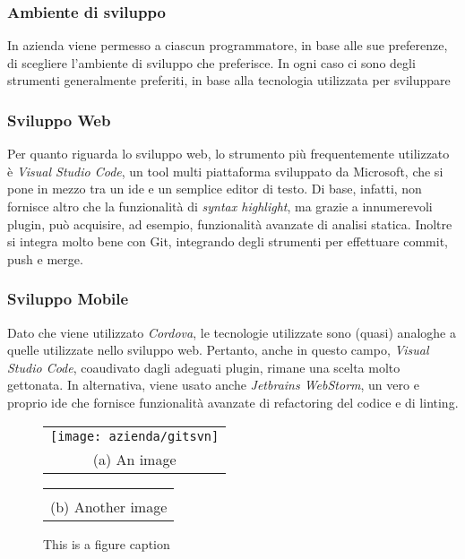 \subsubsection{Ambiente di sviluppo}
In azienda viene permesso a ciascun programmatore, in base alle sue preferenze, di scegliere l'ambiente di sviluppo che preferisce. In ogni caso ci sono degli strumenti generalmente preferiti, in base alla tecnologia utilizzata per sviluppare

\subsubsection{Sviluppo Web}
Per quanto riguarda lo sviluppo web, lo strumento più frequentemente utilizzato è \textit{Visual Studio Code}, un tool multi piattaforma sviluppato da Microsoft, che si pone in mezzo tra un \gls{ide} e un semplice editor di testo. Di base, infatti, non fornisce altro che la funzionalità di \textit{syntax highlight}, ma grazie a innumerevoli plugin, può acquisire, ad esempio, funzionalità avanzate di analisi statica. Inoltre si integra molto bene con Git, integrando degli strumenti per effettuare commit, push e merge.

\subsubsection{Sviluppo Mobile}
Dato che viene utilizzato \textit{Cordova}, le tecnologie utilizzate sono (quasi) analoghe a quelle utilizzate nello sviluppo web. Pertanto, anche in questo campo, \textit{Visual Studio Code}, coaudivato dagli adeguati plugin, rimane una scelta molto gettonata. In alternativa, viene usato anche \textit{Jetbrains WebStorm}, un vero e proprio \gls{ide} che fornisce funzionalità avanzate di refactoring del codice e di linting.

\begin{figure}
	\centering
	\begin{tabular}{@{}c@{}}
		\texttt{[image: azienda/gitsvn]}  \\[\abovecaptionskip]
		\small (a) An image
	\end{tabular}
	
	\vspace{\floatsep}
	
	\begin{tabular}{@{}c@{}}
		\includegraphics[width=.6\linewidth,height=100pt]]{azienda/gitsvn}  \\[\abovecaptionskip]
		\small (b) Another image
	\end{tabular}
	
	\caption{This is a figure caption}\label{fig:myfig}
\end{figure}

